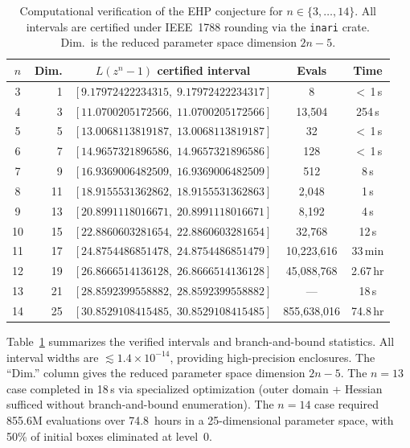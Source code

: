 \documentclass[11pt]{article}
\theoremstyle{plain}
\theoremstyle{definition}
\theoremstyle{remark}
\begin{document}
\begin{table}[ht]
\centering
\caption{Computational verification of the EHP conjecture for $n \in \{3, \ldots, 14\}$. All intervals are certified under IEEE~1788 rounding via the \texttt{inari} crate. Dim.\ is the reduced parameter space dimension $2n-5$.}
\label{tab:results}
\small
\begin{tabular}{crccc}
\toprule
$n$ & \textbf{Dim.} & $L(z^n-1)$ \textbf{certified interval} & \textbf{Evals} & \textbf{Time} \\
\midrule
3 & 1 & $[9.17972422234315,\; 9.17972422234317]$ & 8 & $<$\,1\,s \\
4 & 3 & $[11.0700205172566,\; 11.0700205172566]$ & 13{,}504 & 254\,s \\
5 & 5 & $[13.0068113819187,\; 13.0068113819187]$ & 32 & $<$\,1\,s \\
6 & 7 & $[14.9657321896586,\; 14.9657321896586]$ & 128 & $<$\,1\,s \\
7 & 9 & $[16.9369006482509,\; 16.9369006482509]$ & 512 & 8\,s \\
8 & 11 & $[18.9155531362862,\; 18.9155531362863]$ & 2{,}048 & 1\,s \\
9 & 13 & $[20.8991118016671,\; 20.8991118016671]$ & 8{,}192 & 4\,s \\
10 & 15 & $[22.8860603281654,\; 22.8860603281654]$ & 32{,}768 & 12\,s \\
11 & 17 & $[24.8754486851478,\; 24.8754486851479]$ & 10{,}223{,}616 & 33\,min \\
12 & 19 & $[26.8666514136128,\; 26.8666514136128]$ & 45{,}088{,}768 & 2.67\,hr \\
13 & 21 & $[28.8592399558882,\; 28.8592399558882]$ & --- & 18\,s \\
14 & 25 & $[30.8529108415485,\; 30.8529108415485]$ & 855{,}638{,}016 & 74.8\,hr \\
\bottomrule
\end{tabular}
\end{table}

Table~\ref{tab:results} summarizes the verified intervals and branch-and-bound statistics. All interval widths are $\lesssim 1.4 \times 10^{-14}$, providing high-precision enclosures. The ``Dim.'' column gives the reduced parameter space dimension $2n - 5$. The $n = 13$ case completed in 18\,s via specialized optimization (outer domain + Hessian sufficed without branch-and-bound enumeration). The $n = 14$ case required 855.6M evaluations over 74.8~hours in a 25-dimensional parameter space, with 50\% of initial boxes eliminated at level~0.
\end{document}
